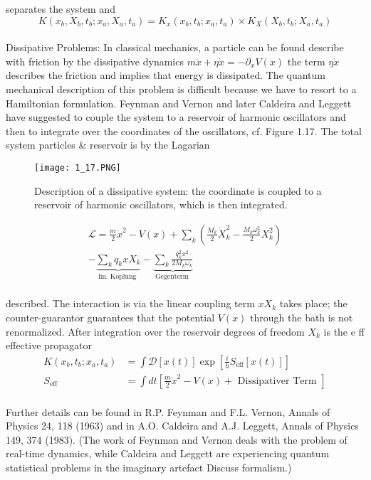 separates the system and
\\
\begin{equation}
K\left(x_{b}, X_{b}, t_{b} ; x_{a}, X_{a}, t_{a}\right)=K_{x}\left(x_{b}, t_{b} ; x_{a}, t_{a}\right) \times K_{X}\left(X_{b}, t_{b} ; X_{a}, t_{a}\right)
\end{equation}\\
Dissipative Problems: In classical mechanics, a particle can be found
describe with friction by the dissipative dynamics $m\ddot{x}+\eta\dot{x}=-\partial_xV(x)$
the term $\eta\dot{x}$ describes the friction and implies that energy
is dissipated. The quantum mechanical description of this problem is
difficult because we have to resort to a Hamiltonian formulation.
Feynman and Vernon and later Caldeira and Leggett have suggested
to couple the system to a reservoir of harmonic oscillators
and then to integrate over the coordinates of the oscillators, cf.
Figure  1.17. The total system particles \& reservoir is by the Lagarian
\begin{figure}[ht]
    \centering
    \texttt{[image: 1\_17.PNG]}
    \caption{Description of a dissipative system: the coordinate is coupled to a reservoir of harmonic oscillators, which is then integrated.}
    \label{fig:1.17}
\end{figure}

\begin{equation}
\begin{array}{r}{\mathcal{L}=\frac{m}{2} \dot{x}^{2}-V(x)+\sum_{k}\left(\frac{M_{k}}{2} \dot{X}_{k}^{2}-\frac{M_{k} \omega_{k}^{2}}{2} X_{k}^{2}\right)} \\ {-\underbrace{\sum_{k} q_{k} x X_{k}}_{\text {lin. Koplung }}-\underbrace{\sum_{k} \frac{q_{k}^{2} x^{2}}{2 M_{k} \omega_{k}}}_{\text {Gegenterm }}}\end{array}
\end{equation}\\
described. The interaction is via the linear coupling term
$xX_k$ takes place; the counter-guarantor guarantees that the potential $V (x)$ through the bath
is not renormalized. After integration over the reservoir degrees of freedom
$X_k$ is the e ff effective propagator
\\
\begin{equation}
\begin{aligned} K\left(x_{b}, t_{b} ; x_{a}, t_{a}\right) &=\int \mathcal{D}[x(t)] \exp \left[\frac{i}{\hbar} S_{\mathrm{eff}}[x(t)]\right] \\ S_{\mathrm{eff}} &=\int d t\left[\frac{m}{2} \dot{x}^{2}-V(x)+\text { Dissipativer Term }\right] \end{aligned}
\end{equation}\\
Further details can be found in R.P. Feynman and F.L. Vernon, Annals of
Physics 24, 118 (1963) and in A.O. Caldeira and A.J. Leggett, Annals of
Physics 149, 374 (1983). (The work of Feynman and Vernon deals with the problem of real-time dynamics,
while Caldeira and Leggett are experiencing quantum statistical problems in the imaginary artefact
Discuss formalism.)

